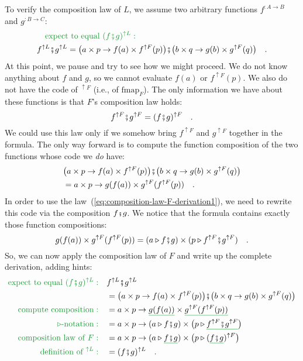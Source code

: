 To verify the composition law of $L$, we assume two arbitrary functions
$f^{:A\rightarrow B}$ and $g^{:B\rightarrow C}$:
\begin{align*}
 & \quad{\color{greenunder}\text{expect to equal }(f\bef g)^{\uparrow L}:}\quad\\
 & f^{\uparrow L}\bef g^{\uparrow L}=\big(a\times p\rightarrow f(a)\times f^{\uparrow F}(p)\big)\bef\big(b\times q\rightarrow g(b)\times g^{\uparrow F}(q)\big)\quad.
\end{align*}
At this point, we pause and try to see how we might proceed. We do
not know anything about $f$ and $g$, so we cannot evaluate $f(a)$
or $f^{\uparrow F}(p)$. We also do not have the code of $^{\uparrow F}$
(i.e., of $\text{fmap}_{F}$). The only information we have about
these functions is that $F$\textsf{'}s composition law holds:
\begin{equation}
f^{\uparrow F}\bef g^{\uparrow F}=(f\bef g)^{\uparrow F}\quad.\label{eq:composition-law-F-derivation1}
\end{equation}
We could use this law only if we somehow bring $f^{\uparrow F}$ and
$g^{\uparrow F}$ together in the formula. The only way forward is
to compute the function composition of the two functions whose code
we \emph{do} have:
\begin{align*}
 & \big(a\times p\rightarrow f(a)\times f^{\uparrow F}(p)\big)\bef\big(b\times q\rightarrow g(b)\times g^{\uparrow F}(q)\big)\\
 & =a\times p\rightarrow g(f(a))\times g^{\uparrow F}(f^{\uparrow F}(p))\quad.
\end{align*}
In order to use the law~(\ref{eq:composition-law-F-derivation1}),
we need to rewrite this code via the composition $f\bef g$. We notice
that the formula contains exactly those function compositions:
\[
g(f(a))\times g^{\uparrow F}(f^{\uparrow F}(p))=(a\triangleright f\bef g)\times(p\triangleright f^{\uparrow F}\bef g^{\uparrow F})\quad.
\]
So, we can now apply the composition law of $F$ and write up the
complete derivation, adding hints:
\begin{align*}
{\color{greenunder}\text{expect to equal }(f\bef g)^{\uparrow L}:}\quad & f^{\uparrow L}\bef g^{\uparrow L}\\
 & =\big(a\times p\rightarrow f(a)\times f^{\uparrow F}(p)\big)\bef\big(b\times q\rightarrow g(b)\times g^{\uparrow F}(q)\big)\\
{\color{greenunder}\text{compute composition}:}\quad & =a\times p\rightarrow\gunderline{g(f(a))}\times\gunderline{g^{\uparrow F}(f^{\uparrow F}(p))}\\
{\color{greenunder}\triangleright\text{-notation}:}\quad & =a\times p\rightarrow(a\triangleright f\bef g)\times\big(p\triangleright\gunderline{f^{\uparrow F}\bef g^{\uparrow F}}\big)\\
{\color{greenunder}\text{composition law of }F:}\quad & =a\times p\rightarrow(a\triangleright\gunderline{f\bef g})\times\big(p\triangleright(\gunderline{f\bef g})^{\uparrow F}\big)\\
{\color{greenunder}\text{definition of }^{\uparrow L}:}\quad & =(f\bef g)^{\uparrow L}\quad.
\end{align*}

